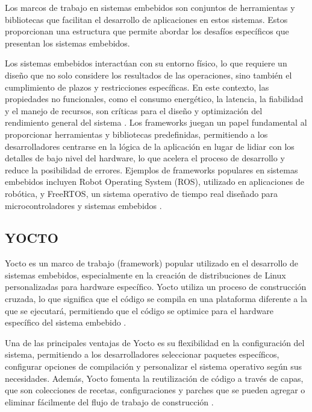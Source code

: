 Los marcos de trabajo en sistemas embebidos son conjuntos de herramientas y bibliotecas que facilitan el desarrollo de aplicaciones en estos 
sistemas. Estos proporcionan una estructura que permite abordar los desafíos específicos que presentan los sistemas embebidos.

Los sistemas embebidos interactúan con su entorno físico, lo que requiere un diseño que no solo considere los resultados de las operaciones, 
sino también el cumplimiento de plazos y restricciones específicas. En este contexto, las propiedades no funcionales, como el consumo energético, 
la latencia, la fiabilidad y el manejo de recursos, son críticas para el diseño y optimización del rendimiento general del sistema \cite{Marugn2017SimulacinYV}. Los frameworks 
juegan un papel fundamental al proporcionar herramientas y bibliotecas predefinidas, permitiendo a los desarrolladores centrarse en la lógica de la 
aplicación en lugar de lidiar con los detalles de bajo nivel del hardware, lo que acelera el proceso de desarrollo y reduce la posibilidad de errores. 
Ejemplos de frameworks populares en sistemas embebidos incluyen Robot Operating System (ROS), utilizado en aplicaciones de robótica, y FreeRTOS, 
un sistema operativo de tiempo real diseñado para microcontroladores y sistemas embebidos \cite{HerreraLpez2023EntornoDT}.

\subsection{YOCTO}\label{subsec:yocto}

Yocto es un marco de trabajo (framework) popular utilizado en el desarrollo de sistemas embebidos, especialmente en la creación de distribuciones de Linux 
personalizadas para hardware específico. Yocto utiliza un proceso de construcción cruzada, lo que significa que el código se compila en una plataforma diferente 
a la que se ejecutará, permitiendo que el código se optimice para el hardware específico del sistema embebido \cite{Leppakoski2013FrameworkFI}.

Una de las principales ventajas de Yocto es su flexibilidad en la configuración del sistema, permitiendo a los desarrolladores seleccionar paquetes específicos, 
configurar opciones de compilación y personalizar el sistema operativo según sus necesidades. Además, Yocto fomenta la reutilización de código a través de capas, 
que son colecciones de recetas, configuraciones y parches que se pueden agregar o eliminar fácilmente del flujo de trabajo de construcción \cite{Leppakoski2013FrameworkFI}.

